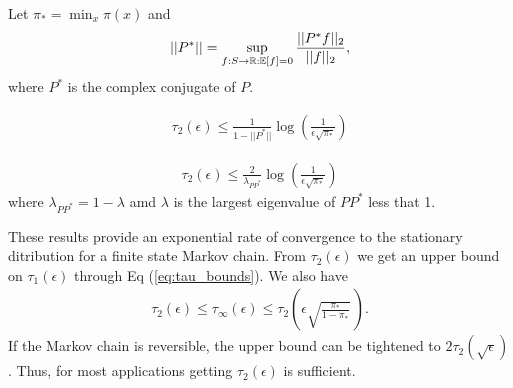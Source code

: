 \documentclass[all-lectures.tex]{subfiles}
\begin{document}
Let $\pi_* = \min_x \pi(x)$ and
\begin{align*}
||P^*|| = \sup_{f:S\to \mathbb{R}: \mathbb{E}[f] =0} \frac{||P^*f||_2}{||f||_2},
\end{align*}
where $P^*$ is the complex conjugate of $P$. 
\begin{prop}
\begin{align*}
\tau_2(\epsilon) \leq \frac{1}{1-||P^*||} \log\left(\frac{1}{\epsilon \sqrt{\pi_*}}\right)
\end{align*}
\end{prop}
\begin{prop}
\begin{align*}
\tau_2(\epsilon) \leq \frac{2}{\lambda_{PP^*}} \log\left( \frac{1}{\epsilon \sqrt{\pi_*}}\right) 
\end{align*}
where $\lambda_{PP^*} = 1-\lambda$ amd $\lambda$ is the largest eigenvalue of $PP^*$ less that 1.
\end{prop}
These results provide an exponential rate of convergence to the stationary ditribution for a finite state Markov chain. From $\tau_2(\epsilon)$ we get an upper bound on $\tau_1(\epsilon)$ through Eq (\ref{eq:tau_bounds}). We also have
\begin{align*}
\tau_2(\epsilon) \leq \tau_\infty (\epsilon) \leq \tau_2\left(\epsilon \sqrt{\frac{\pi_*}{1-\pi_*}}\,\right).
\end{align*}
If the Markov chain is reversible, the upper bound can be tightened to $2\tau_2(\sqrt{\epsilon})$. Thus, for most applications getting $\tau_2(\epsilon)$ is sufficient.  
\end{document}

